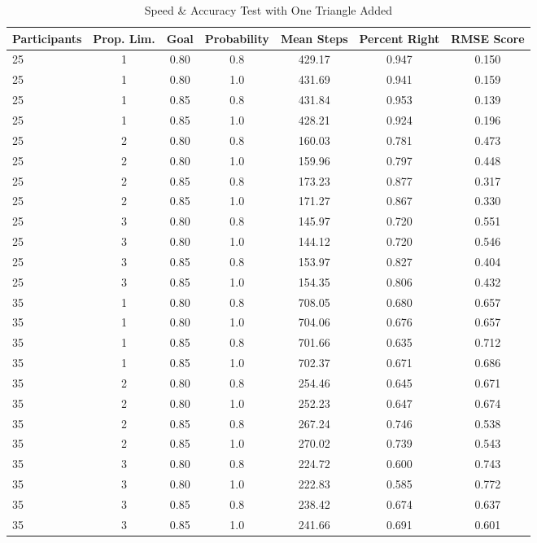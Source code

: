 \documentclass[11pt]{article}
\begin{document}
\begin{table}[H]
\caption{Speed \& Accuracy Test with One Triangle Added}
\label{triangle}
\vspace{3mm}
\centering
\begin{tabular}{lcccccc}
\toprule
\multicolumn{1}{l}{Participants}  & \multicolumn{1}{c}{Prop. Lim.} & \multicolumn{1}{c}{Goal} & \multicolumn{1}{c}{Probability} & \multicolumn{1}{c}{Mean Steps} & \multicolumn{1}{c}{Percent Right} & \multicolumn{1}{c}{RMSE Score} \\
\midrule
25 & 1 & 0.80 &0.8 & 429.17 & 0.947 & 0.150 \\
25 & 1 & 0.80 &1.0 & 431.69 & 0.941 & 0.159 \\
25 & 1 & 0.85 &0.8 & 431.84 & 0.953 & 0.139 \\
25 & 1 & 0.85 &1.0 & 428.21 & 0.924 & 0.196 \\
25 & 2 & 0.80 &0.8 & 160.03 & 0.781 & 0.473 \\
25 & 2 & 0.80 &1.0 & 159.96 & 0.797 & 0.448 \\
25 & 2 & 0.85 &0.8 & 173.23 & 0.877 & 0.317 \\
25 & 2 & 0.85 &1.0 & 171.27 & 0.867 & 0.330 \\
25 & 3 & 0.80 &0.8 & 145.97 & 0.720 & 0.551 \\
25 & 3 & 0.80 &1.0 & 144.12 & 0.720 & 0.546 \\
25 & 3 & 0.85 &0.8 & 153.97 & 0.827 & 0.404 \\
25 & 3 & 0.85 &1.0 & 154.35 & 0.806 & 0.432 \\
35 & 1 & 0.80 &0.8 & 708.05 & 0.680 & 0.657 \\
35 & 1 & 0.80 &1.0 & 704.06 & 0.676 & 0.657 \\
35 & 1 & 0.85 &0.8 & 701.66 & 0.635 & 0.712 \\
35 & 1 & 0.85 &1.0 & 702.37 & 0.671 & 0.686 \\
35 & 2 & 0.80 &0.8 & 254.46 & 0.645 & 0.671 \\
35 & 2 & 0.80 &1.0 & 252.23 & 0.647 & 0.674 \\
35 & 2 & 0.85 &0.8 & 267.24 & 0.746 & 0.538 \\
35 & 2 & 0.85 &1.0 & 270.02 & 0.739 & 0.543 \\
35 & 3 & 0.80 &0.8 & 224.72 & 0.600 & 0.743 \\
35 & 3 & 0.80 &1.0 & 222.83 & 0.585 & 0.772 \\
35 & 3 & 0.85 &0.8 & 238.42 & 0.674 & 0.637 \\
35 & 3 & 0.85 &1.0 & 241.66 & 0.691 & 0.601 \\
\bottomrule
\end{tabular}
\end{table}
\end{document}
